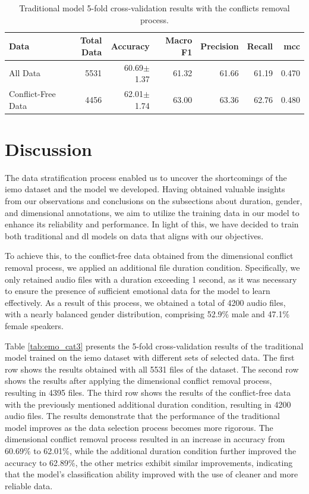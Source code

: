 \begin{table}[H]
	\small
	\centering
	\caption{Traditional model 5-fold cross-validation results with the conflicts removal process.}
	\label{tab:emo_cat2}
	\centering
	\begin{tabular}{lrrrrrr}
		\toprule
		Data   & Total Data						 	& Accuracy    & Macro F1    & Precision   & Recall      & \ac{mcc}       \\
		\midrule
		All Data & 5531 & 60.69$\pm$1.37 & 61.32 & 61.66 & 61.19 & 0.470 \\
		Conflict-Free Data & 4456 & 62.01$\pm$1.74 & 63.00 & 63.36 & 62.76 & 0.480 \\
		\bottomrule
	\end{tabular}
\end{table}


\section{Discussion}

The data stratification process enabled us to uncover the shortcomings of the \ac{iemo} dataset and the model we developed. Having obtained valuable insights from our observations and conclusions on the subsections about duration, gender, and dimensional annotations, we aim to utilize the training data in our model to enhance its reliability and performance. In light of this, we have decided to train both traditional and \ac{dl} models on data that aligns with our objectives.

To achieve this, to the conflict-free data obtained from the dimensional conflict removal process, we applied an additional file duration condition. Specifically, we only retained audio files with a duration exceeding 1 second, as it was necessary to ensure the presence of sufficient emotional data for the model to learn effectively. As a result of this process, we obtained a total of 4200 audio files, with a nearly balanced gender distribution, comprising 52.9\% male and 47.1\% female speakers.

Table \ref{tab:emo_cat3} presents the 5-fold cross-validation results of the traditional model trained on the \ac{iemo} dataset with different sets of selected data. The first row shows the results obtained with all 5531 files of the dataset. The second row shows the results after applying the dimensional conflict removal process, resulting in 4395 files. The third row shows the results of the conflict-free data with the previously mentioned additional duration condition, resulting in 4200 audio files. The results demonstrate that the performance of the traditional model improves as the data selection process becomes more rigorous. The dimensional conflict removal process resulted in an increase in accuracy from 60.69\% to 62.01\%, while the additional duration condition further improved the accuracy to 62.89\%, the other metrics exhibit similar improvements, indicating that the model's classification ability improved with the use of cleaner and more reliable data.

